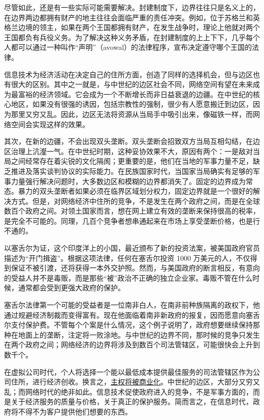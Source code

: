 尽管如此，还是有一些实际可能需要解决。封建制度下，边界往往只是名义上的，在边界两边都拥有财产的地主往往会面临严重的责任冲突。例如，位于苏格兰和英格兰边境的领主，如果在两个王国都拥有财产，在发生战争时，理论上他就对两个王国都负有兵役义务。为了解决这种义务矛盾，在封建制度的上上下下，几乎每个人都可以通过一种叫作“声明”（avowal）的法律程序，宣布决定遵守哪个王国的法律。

信息技术为经济活动在决定自己的住所方面，创造了同样的选择机会，但与边区也有很大的区别。其中之一就是，与中世纪的边区社会不同，网络空间有望在未来成为最富裕的经济领域。它会成为一个不断增长而非日益衰退的边疆。在中世纪的核心地区，如果没有很强的诱因，包括宗教性的强制，很少有人愿意搬迁到边区，因为那里又穷又乱。因此，边区无法将资源从当局手中吸引出来，像磁铁一样，而网络空间会实现这样的效果。

其次，在新的边疆，不会出现双头垄断。双头垄断会招致双方当局互相勾结，在边区治理上沆瀣一气。在中世纪时期，这种妥协效果不大，原因有两个：一是敌对当局之间经常存在着尖锐的文化隔阂；更重要的是，他们在当地的军事力量不足，缺乏推进及落实谈判协议的实际能力。在民族国家时代，当国家当局确实有足够的军事力量强行解决问题时，大多数边区和模糊的边界都消失了。固定的边界成为常态。暴力的双头垄断者如果必须在临界区域划分权力，固定边界就是一个很好的解决方式。但是，对网络经济中住所的竞争，不是发生在两个政府之间，而是在全球数百个政府之间。对领土国家而言，想在网上建立有效的垄断来保持很高的税率，是完全不可能的。同理，几百个竞争者想串通起来在市场上享受垄断价格，也是行不通的。

以塞舌尔为证，这个印度洋上的小国，最近颁布了新的投资法案，被美国政府官员描述为“开门揖盗”。根据这项法律，任何在塞舌尔投资 1000 万美元的人，不仅得到保证不被引渡，还将获得一本外交护照。然而，与美国政府的断言相反，有意向的受益人并不是毒贩，而是那些“被”政治不正确的独立企业家。毒贩不管在什么时候，通常都会受到更强大政府的保护。

塞舌尔法律第一个可能的受益者是一位南非白人，在南非前种族隔离的政权下，他通过规避经济制裁而变得富有。现在他面临着南非新政府的报复，因而愿意向塞舌尔支付保护费。不管每个个案是什么情况，这个例子说明了，政府想要继续保持那种在地面上的垄断，注定将一败涂地。与中世纪的边界不同，那时候的竞争只发生在两个政府之间；网络经济的边界将涉及到数百个司法管辖区，可能很快会上升到数千个。

在虚拟公司时代，个人将选择一个能以最低成本提供最佳服务的司法管辖区作为公司住所，进行经济创收。换言之，\uline{主权将被商业化}。中世纪的边区，大部分又穷又乱；而网络时代的绝非如此。信息技术促使政府进入的竞争，不是军事方面的，而是关于经济服务的质量与价格，关于真正的保护服务。简而言之，在信息时代，政府将不得不为客户提供他们想要的东西。


